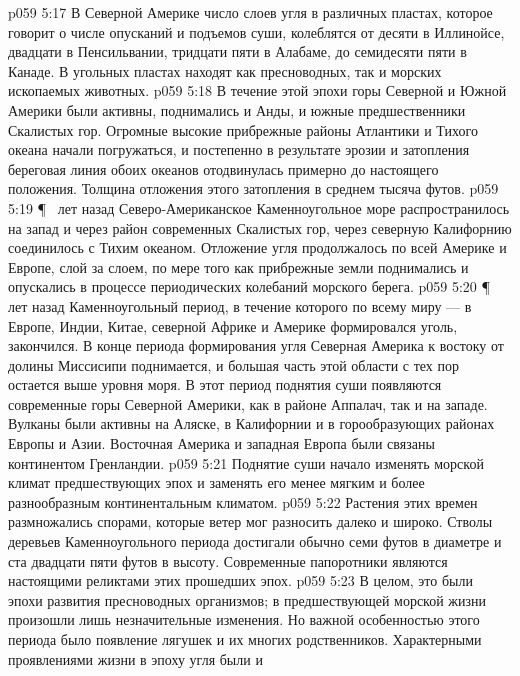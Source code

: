 \vs p059 5:17 В Северной Америке число слоев угля в различных пластах, которое говорит о числе опусканий и подъемов суши, колеблятся от десяти в Иллинойсе, двадцати в Пенсильвании, тридцати пяти в Алабаме, до семидесяти пяти в Канаде. В угольных пластах находят как пресноводных, так и морских ископаемых животных.
\vs p059 5:18 В течение этой эпохи горы Северной и Южной Америки были активны, поднимались и Анды, и южные предшественники Скалистых гор. Огромные высокие прибрежные районы Атлантики и Тихого океана начали погружаться, и постепенно в результате эрозии и затопления береговая линия обоих океанов отодвинулась примерно до настоящего положения. Толщина отложения этого затопления в среднем тысяча футов.
\vs p059 5:19 \P\  лет назад Северо\hyp{}Американское Каменноугольное море распространилось на запад и через район современных Скалистых гор, через северную Калифорнию соединилось с Тихим океаном. Отложение угля продолжалось по всей Америке и Европе, слой за слоем, по мере того как прибрежные земли поднимались и опускались в процессе периодических колебаний морского берега.
\vs p059 5:20 \P\  лет назад Каменноугольный период, в течение которого по всему миру --- в Европе, Индии, Китае, северной Африке и Америке формировался уголь, закончился. В конце периода формирования угля Северная Америка к востоку от долины Миссисипи поднимается, и большая часть этой области с тех пор остается выше уровня моря. В этот период поднятия суши появляются современные горы Северной Америки, как в районе Аппалач, так и на западе. Вулканы были активны на Аляске, в Калифорнии и в горообразующих районах Европы и Азии. Восточная Америка и западная Европа были связаны континентом Гренландии.
\vs p059 5:21 Поднятие суши начало изменять морской климат предшествующих эпох и заменять его менее мягким и более разнообразным континентальным климатом.
\vs p059 5:22 Растения этих времен размножались спорами, которые ветер мог разносить далеко и широко. Стволы деревьев Каменноугольного периода достигали обычно семи футов в диаметре и ста двадцати пяти футов в высоту. Современные папоротники являются настоящими реликтами этих прошедших эпох.
\vs p059 5:23 В целом, это были эпохи развития пресноводных организмов; в предшествующей морской жизни произошли лишь незначительные изменения. Но важной особенностью этого периода было  появление лягушек и их многих родственников. Характерными проявлениями жизни в эпоху угля были  и 
